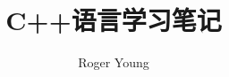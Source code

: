\documentclass{ctexbook}
\newcommand{\documentTitle}
    {\texorpdfstring{C++语言学习笔记}{C++语言学习笔记}}
\newcommand{\documentAuthor}{Roger Young}
\begin{document}
\title{\documentTitle}
\author{\documentAuthor}

\maketitle
\tableofcontents








\printindex
\printglossaries
\end{document}
